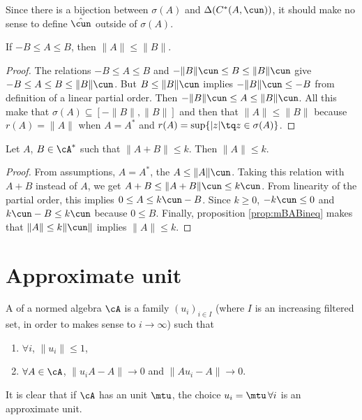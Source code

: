 Since there is a bijection between $\sigma(A)$ and $\Delta(C^*(A,\cun))$, it should make no sense to define $\hat\cun$ outside of $\sigma(A)$.

\begin{proposition} \label{prop:mBABineq}
If $-B\leq A\leq B$, then $\| A \|\leq\| B \|$.
\end{proposition}

\begin{proof}
The relations $-B\leq A\leq B$ and $-\| B \|\cun\leq B\leq\| B \|\cun$ give $-B\leq A\leq B\leq\| B \|\cun$. But $B\leq\| B \|\cun$ implies $-\| B \|\cun\leq-B$ from definition of a linear partial order. Then $-\| B \|\cun\leq A\leq\| B \|\cun$. All this make that $\sigma(A)\subseteq[-\| B \|,\| B \|]$ and then that $\| A \|\leq\| B \|$ because $r(A)=\| A \|$ when $A=A^*$ and $r(A)=\sup\{ | z |\tq z\in\sigma(A) \}$.
\end{proof}

\begin{proposition}
Let $A$, $B\in\cA^*$ such that $\| A+B \|\leq k$. Then $\| A \|\leq k$.
\end{proposition}

\begin{proof}
From assumptions, $A=A^*$, the $A\leq\| A \|\cun$. Taking this relation with $A+B$ instead of $A$, we get $A+B\leq\| A+B \|\cun\leq k\cun$. From linearity of the partial order, this implies $0\leq A\leq k\cun -B$. Since $k\geq 0$, $-k\cun\leq 0$ and $k\cun-B\leq k\cun$ because $0\leq B$. Finally, proposition \ref{prop:mBABineq}  makes that $\| A \|\leq k\| \cun \|$ implies $\| A \|\leq k$.
\end{proof}

\section{Approximate unit}

\begin{definition}
 A  of a normed algebra $\cA$ is a family $(u_i)_{i\in I}$ (where $I$ is an increasing filtered set, in order to makes sense to $i\to\infty$) such 
that 
\begin{enumerate}
\item  $\forall i$, $\|u_i\|\leq 1$,
\item  $\forall A\in\cA$, $\|u_iA-A\|\to 0$ and $\|Au_i-A\|\to 0$. \label{enuoii}
\end{enumerate}
\label{def:app_unit}
\end{definition}
It is clear that if $\cA$ has an unit $\mtu$, the choice $u_i=\mtu\,\forall i$ is an approximate unit.

